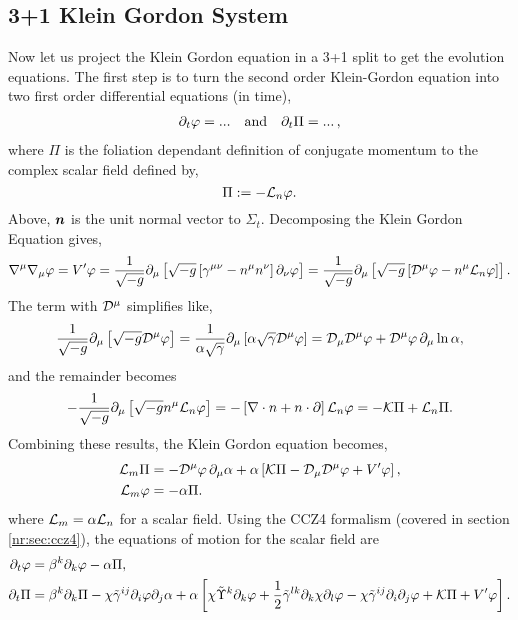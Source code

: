 \subsection{3+1 Klein Gordon System} \label{boson:sec:3+1kgeqn}
Now let us project the Klein Gordon equation in a 3+1 split to get the evolution equations. The first step is to turn the second order Klein-Gordon equation into two first order differential equations (in time),
\begin{align} 
\partial_t \varphi = ...  \quad {\rm and}\quad \partial_t \Pi = ... \,,
\end{align}
where $\Pi$ is the foliation dependant definition of conjugate momentum to the complex scalar field defined by,
\begin{equation} \Pi:= -\mathcal{L}_n \varphi. \label{boson:eq:Pidef}\end{equation}
Above, $\boldsymbol{n}$ is the unit normal vector to $\Sigma_t$. Decomposing the Klein Gordon Equation gives,
\begin{equation} 
\nabla^\mu \nabla_\mu \varphi = V' \varphi = \frac{1}{\sqrt{-g}} \partial_\mu \left[ \sqrt{-g}\left[\gamma^{\mu\nu}-n^\mu n^\nu\right]\partial_\nu \varphi\right] = \frac{1}{\sqrt{-g}} \partial_\mu \left[ \sqrt{-g}\left[\mathcal{D}^\mu\varphi-n^\mu \mathcal{L}_n\varphi\right]\right]. 
\end{equation}
The term with $\mathcal{D}^\mu$ simplifies like,
\begin{equation}\frac{1}{\sqrt{-g}} \partial_\mu \left[ \sqrt{-g}\mathcal{D}^\mu\varphi\right] =  \frac{1}{\alpha\sqrt{\gamma}} \partial_\mu \left[\alpha\sqrt{\gamma}\mathcal{D}^\mu\varphi\right]  = \mathcal{D}_\mu \mathcal{D}^\mu \varphi + \mathcal{D}^\mu \varphi \,\partial_\mu \ln \alpha,\end{equation}
and the remainder becomes
\begin{equation}-\frac{1}{\sqrt{-g}} \partial_\mu \left[ \sqrt{-g}n^\mu \mathcal{L}_n\varphi\right] = -\left[\nabla \cdot n + n\cdot \partial\right]\mathcal{L}_n\varphi = -\mathcal{K}\Pi + \mathcal{L}_n \Pi.\end{equation}
Combining these results, the Klein Gordon equation becomes,
\begin{align}
 \mathcal{L}_m \Pi &= - \mathcal{D}^\mu\varphi\,\partial_\mu \alpha+\alpha\left[\mathcal{K}\Pi - \mathcal{D}_\mu \mathcal{D}^\mu \varphi  + V'\varphi\right], \\
 \mathcal{L}_m \varphi &= - \alpha\Pi.\end{align}
where $\mathcal{L}_m = \alpha \mathcal{L}_n$ for a scalar field. Using the CCZ4 formalism (covered in section \ref{nr:sec:ccz4}), the equations of motion for the scalar field are
\begin{align}
\partial_t \varphi &= \beta^k\partial_k \varphi - \alpha\Pi ,\label{boson:eq:ccz4kg1}\\
\partial_t \Pi &= \beta^k\partial_k\Pi -\chi \tilde{\gamma}^{ij}\partial_i \varphi \partial_j \alpha + \alpha \left[ \chi \tilde{\Upsilon}^k\partial_k \varphi+\frac{1}{2} \tilde{\gamma}^{lk}\partial_k\chi\partial_l\varphi  - \chi \tilde{\gamma}^{ij}\partial_i \partial_j \varphi + \mathcal{K} \Pi + V' \varphi \right].\label{boson:eq:ccz4kg2}
\end{align}
